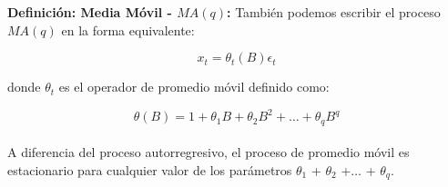%	
%	
%	
\pagebreak
\begin{mdframed}[style=MyFrame]
	\begin{definition}\label{def6}
		\textbf{Definici\'on:  Media M\'ovil - $MA (q)$:}
			Tambi\'en podemos escribir el proceso $MA (q)$ en la forma equivalente:
		
		\begin{equation}
		x_t = \theta_t (B) \epsilon_{t} 
		\end{equation}
		
		donde  $\theta_t$ es el operador de promedio m\'ovil definido como:
		
		\begin{equation}
		\theta (B) = 1 + \theta_1B + \theta_2B^2 + \dots{} + \theta_q B^q
		\end{equation}
		\\
		\vspace{4mm}	
		A diferencia del proceso autorregresivo, el proceso de promedio m\'ovil es estacionario para cualquier valor de los par\'ametros $\theta_1$ + $\theta_2$ +$ \dots{}$ + $\theta_q$.
		
	\end{definition}
\end{mdframed}



